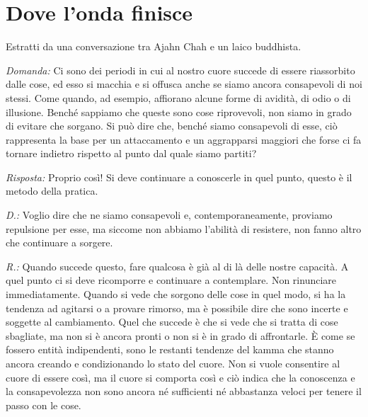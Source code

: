 \chapter{Dove l'onda finisce}

\begin{openingQuote}
  \centering

  Estratti da una conversazione tra Ajahn Chah e un laico buddhista.
\end{openingQuote}

\emph{Domanda:} Ci sono dei periodi in cui al nostro cuore succede di essere
riassorbito dalle cose, ed esso si macchia e si offusca anche se siamo
ancora consapevoli di noi stessi. Come quando, ad esempio, affiorano
alcune forme di avidità, di odio o di illusione. Benché sappiamo che
queste sono cose riprovevoli, non siamo in grado di evitare che sorgano.
Si può dire che, benché siamo consapevoli di esse, ciò rappresenta la
base per un attaccamento e un aggrapparsi maggiori che forse ci fa
tornare indietro rispetto al punto dal quale siamo partiti?

\emph{Risposta:} Proprio così! Si deve continuare a conoscerle in quel punto,
questo è il metodo della pratica.

\emph{D.:} Voglio dire che ne siamo consapevoli e, contemporaneamente, proviamo
repulsione per esse, ma siccome non abbiamo l'abilità di resistere, non
fanno altro che continuare a sorgere.

\emph{R.:} Quando succede questo, fare qualcosa è già al di là delle nostre
capacità. A quel punto ci si deve ricomporre e continuare a contemplare.
Non rinunciare immediatamente. Quando si vede che sorgono delle cose in
quel modo, si ha la tendenza ad agitarsi o a provare rimorso, ma è
possibile dire che sono incerte e soggette al cambiamento. Quel che
succede è che si vede che si tratta di cose sbagliate, ma non si è
ancora pronti o non si è in grado di affrontarle. È come se fossero
entità indipendenti, sono le restanti tendenze del kamma che
stanno ancora creando e condizionando lo stato del cuore. Non si vuole
consentire al cuore di essere così, ma il cuore si comporta così e ciò
indica che la conoscenza e la consapevolezza non sono ancora né
sufficienti né abbastanza veloci per tenere il passo con le cose.

